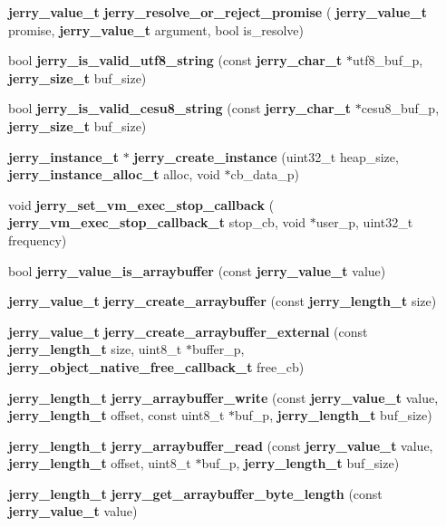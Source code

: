 \begin{DoxyCompactItemize}
\item 
\textbf{ jerry\+\_\+value\+\_\+t} \textbf{ jerry\+\_\+resolve\+\_\+or\+\_\+reject\+\_\+promise} (\textbf{ jerry\+\_\+value\+\_\+t} promise, \textbf{ jerry\+\_\+value\+\_\+t} argument, bool is\+\_\+resolve)
\item 
bool \textbf{ jerry\+\_\+is\+\_\+valid\+\_\+utf8\+\_\+string} (const \textbf{ jerry\+\_\+char\+\_\+t} $\ast$utf8\+\_\+buf\+\_\+p, \textbf{ jerry\+\_\+size\+\_\+t} buf\+\_\+size)
\item 
bool {\bfseries jerry\+\_\+is\+\_\+valid\+\_\+cesu8\+\_\+string} (const \textbf{ jerry\+\_\+char\+\_\+t} $\ast$cesu8\+\_\+buf\+\_\+p, \textbf{ jerry\+\_\+size\+\_\+t} buf\+\_\+size)
\item 
\textbf{ jerry\+\_\+instance\+\_\+t} $\ast$ {\bfseries jerry\+\_\+create\+\_\+instance} (uint32\+\_\+t heap\+\_\+size, \textbf{ jerry\+\_\+instance\+\_\+alloc\+\_\+t} alloc, void $\ast$cb\+\_\+data\+\_\+p)
\item 
void \textbf{ jerry\+\_\+set\+\_\+vm\+\_\+exec\+\_\+stop\+\_\+callback} (\textbf{ jerry\+\_\+vm\+\_\+exec\+\_\+stop\+\_\+callback\+\_\+t} stop\+\_\+cb, void $\ast$user\+\_\+p, uint32\+\_\+t frequency)
\item 
bool \textbf{ jerry\+\_\+value\+\_\+is\+\_\+arraybuffer} (const \textbf{ jerry\+\_\+value\+\_\+t} value)
\item 
\textbf{ jerry\+\_\+value\+\_\+t} {\bfseries jerry\+\_\+create\+\_\+arraybuffer} (const \textbf{ jerry\+\_\+length\+\_\+t} size)
\item 
\textbf{ jerry\+\_\+value\+\_\+t} {\bfseries jerry\+\_\+create\+\_\+arraybuffer\+\_\+external} (const \textbf{ jerry\+\_\+length\+\_\+t} size, uint8\+\_\+t $\ast$buffer\+\_\+p, \textbf{ jerry\+\_\+object\+\_\+native\+\_\+free\+\_\+callback\+\_\+t} free\+\_\+cb)
\item 
\textbf{ jerry\+\_\+length\+\_\+t} {\bfseries jerry\+\_\+arraybuffer\+\_\+write} (const \textbf{ jerry\+\_\+value\+\_\+t} value, \textbf{ jerry\+\_\+length\+\_\+t} offset, const uint8\+\_\+t $\ast$buf\+\_\+p, \textbf{ jerry\+\_\+length\+\_\+t} buf\+\_\+size)
\item 
\textbf{ jerry\+\_\+length\+\_\+t} {\bfseries jerry\+\_\+arraybuffer\+\_\+read} (const \textbf{ jerry\+\_\+value\+\_\+t} value, \textbf{ jerry\+\_\+length\+\_\+t} offset, uint8\+\_\+t $\ast$buf\+\_\+p, \textbf{ jerry\+\_\+length\+\_\+t} buf\+\_\+size)
\item 
\textbf{ jerry\+\_\+length\+\_\+t} {\bfseries jerry\+\_\+get\+\_\+arraybuffer\+\_\+byte\+\_\+length} (const \textbf{ jerry\+\_\+value\+\_\+t} value)

\end{DoxyCompactItemize}
